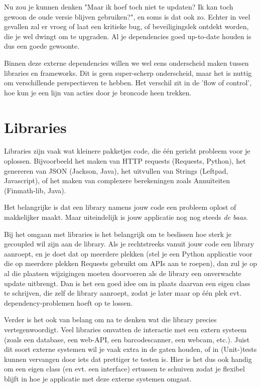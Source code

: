 Nu zou je kunnen denken "Maar ik hoef toch niet te updaten? Ik kan toch gewoon de oude versie blijven gebruiken?",
en soms is dat ook zo. Echter in veel gevallen zal er vroeg of laat een kritieke bug, of beveiligingslek ontdekt 
worden, die je wel dwingt om te upgraden. Al je dependencies goed up-to-date houden is dus een goede gewoonte.

Binnen deze externe dependencies willen we wel eens onderscheid maken tussen libraries en frameworks. 
Dit is geen super-scherp onderscheid, maar het is nuttig om verschillende perspectieven te hebben. 
Het verschil zit in de 'flow of control', hoe kun je een lijn van acties door je broncode heen trekken. 

\section{Libraries}

Libraries zijn vaak wat kleinere pakketjes code, die één gericht probleem voor je oplossen. Bijvoorbeeld het 
maken van HTTP requests (Requests, Python), het genereren van JSON (Jackson, Java), het uitvullen van Strings (Leftpad, Javascript),
of het maken van complexere berekeningen zoals Annuïteiten (Finmath-lib, Java).

Het belangrijke is dat een library namens jouw code een probleem oplost of makkelijker maakt. Maar uiteindelijk is jouw applicatie nog
nog steeds \emph{de baas}.

Bij het omgaan met libraries is het belangrijk om te beslissen hoe sterk je gecoupled wil zijn aan de library.
Als je rechtstreeks vanuit jouw code een library aanroept, en je doet dat op meerdere plekken 
(stel je een Python applicatie voor die op meerdere plekken Requests gebruikt om APIs aan te roepen), dan zul je 
op al die plaatsen wijzigingen moeten doorvoeren als de library een onverwachte update uitbrengt. Dan is het een
goed idee om in plaats daarvan een eigen class te schrijven, die zelf de library aanroept, zodat je later maar
op één plek evt. dependency-problemen hoeft op te lossen.

Verder is het ook van belang om na te denken wat die library precies vertegenwoordigt. Veel libraries omvatten
de interactie met een extern systeem (zoals een database, een web-API, een barcodescanner, een webcam, etc.). Juist 
dit soort externe systemen wil je vaak extra in de gaten houden, of in (Unit-)tests kunnen vervangen door iets 
dat prettiger te testen is. Hier is het dus ook handig om een eigen class (en evt. een interface) ertussen te schuiven
zodat je flexibel blijft in hoe je applicatie met deze externe systemen omgaat.

